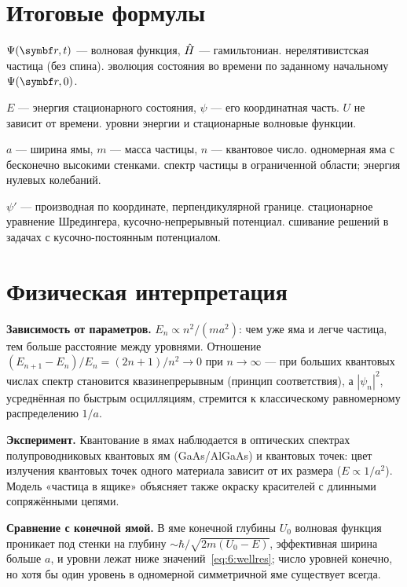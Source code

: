 \section{Итоговые формулы}

 {$\Psi(\vect r,t)$ — волновая функция, $\hat{H}$ — гамильтониан.}
 {нерелятивистская частица (без спина).}
 {эволюция состояния во времени по заданному начальному $\Psi(\vect r,0)$.}

 {$E$ — энергия стационарного состояния, $\psi$ — его координатная часть.}
 {$U$ не зависит от времени.}
 {уровни энергии и стационарные волновые функции.}

 {$a$ — ширина ямы, $m$ — масса частицы, $n$ — квантовое число.}
 {одномерная яма с бесконечно высокими стенками.}
 {спектр частицы в ограниченной области; энергия нулевых колебаний.}

 {$\psi'$ — производная по координате, перпендикулярной границе.}
 {стационарное уравнение Шредингера, кусочно-непрерывный потенциал.}
 {сшивание решений в задачах с кусочно-постоянным потенциалом.}

\section{Физическая интерпретация}

\textbf{Зависимость от параметров.} $E_n\propto n^2/(ma^2)$: чем уже яма и легче частица, тем
больше расстояние между уровнями. Отношение $(E_{n+1}-E_n)/E_n=(2n+1)/n^2\to0$ при $n\to\infty$ —
при больших квантовых числах спектр становится квазинепрерывным (принцип соответствия), а
$|\psi_n|^2$, усреднённая по быстрым осцилляциям, стремится к классическому равномерному
распределению $1/a$.

\textbf{Эксперимент.} Квантование в ямах наблюдается в оптических спектрах полупроводниковых
квантовых ям (GaAs/AlGaAs) и квантовых точек: цвет излучения квантовых точек одного материала
зависит от их размера ($E\propto1/a^2$). Модель «частица в ящике» объясняет также окраску
красителей с длинными сопряжёнными цепями.

\textbf{Сравнение с конечной ямой.} В яме конечной глубины $U_0$ волновая функция проникает под
стенки на глубину $\sim\hbar/\sqrt{2m(U_0-E)}$, эффективная ширина больше $a$, и уровни лежат ниже
значений~\eqref{eq:6:wellres}; число уровней конечно, но хотя бы один уровень в одномерной
симметричной яме существует всегда.

